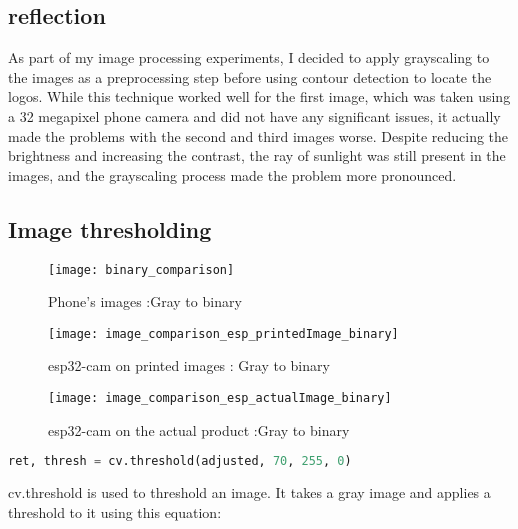 \subsection{reflection}
As part of my image processing experiments, I decided to apply grayscaling to the images as a preprocessing step before using contour detection to locate the logos. While this technique worked well for the first image, which was taken using a 32 megapixel phone camera and did not have any significant issues, it actually made the problems with the second and third images worse. Despite reducing the brightness and increasing the contrast, the ray of sunlight was still present in the images, and the grayscaling process made the problem more pronounced.
\subsection{Image thresholding}

\FloatBarrier
\begin{figure}[h]
\FloatBarrier
         \centering
        \texttt{[image: binary\_comparison]}
   
        \caption{Phone's images :Gray to binary}
        \label{fig:Phone's images : Gray to binary}
\FloatBarrier
    \end{figure}


\FloatBarrier
\FloatBarrier
\begin{figure}[h]
\FloatBarrier
         \centering
        \texttt{[image: image\_comparison\_esp\_printedImage\_binary]}
   
        \caption{esp32-cam on printed images : Gray to binary}
        \label{fig:Phone's images : Gray to binary}
\FloatBarrier
    \end{figure}


\FloatBarrier
\FloatBarrier
\begin{figure}[h]
\FloatBarrier
         \centering
        \texttt{[image: image\_comparison\_esp\_actualImage\_binary]}
   
        \caption{esp32-cam on the actual product :Gray to binary}
        \label{fig:Phone's images :  Gray to binary}
\FloatBarrier
    \end{figure}


\FloatBarrier 
\begin{lstlisting}[language=Python]
 ret, thresh = cv.threshold(adjusted, 70, 255, 0)
\end{lstlisting}
 cv.threshold is used to threshold an image. It takes a gray image and applies a threshold to it \cite{WG10} using this equation:


